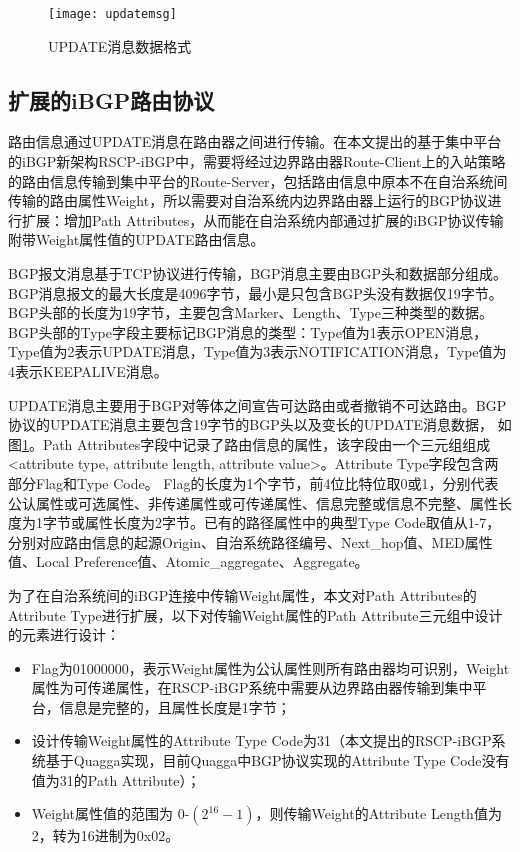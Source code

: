 \begin{figure}
  \centering
  \texttt{[image: updatemsg]}
  \caption{UPDATE消息数据格式}
  \label{fig:updatemsg}
\end{figure}



\subsection{扩展的iBGP路由协议}
路由信息通过UPDATE消息在路由器之间进行传输。在本文提出的基于集中平台的iBGP新架构RSCP-iBGP中，需要将经过边界路由器Route-Client上的入站策略的路由信息传输到集中平台的Route-Server，包括路由信息中原本不在自治系统间传输的路由属性Weight，所以需要对自治系统内边界路由器上运行的BGP协议进行扩展：增加Path Attributes，从而能在自治系统内部通过扩展的iBGP协议传输附带Weight属性值的UPDATE路由信息。

BGP报文消息\cite{rfc4271}基于TCP协议进行传输，BGP消息主要由BGP头和数据部分组成。BGP消息报文的最大长度是4096字节，最小是只包含BGP头没有数据仅19字节。BGP头部的长度为19字节，主要包含Marker、Length、Type三种类型的数据。BGP头部的Type字段主要标记BGP消息的类型：Type值为1表示OPEN消息，Type值为2表示UPDATE消息，Type值为3表示NOTIFICATION消息，Type值为4表示KEEPALIVE消息。

UPDATE消息主要用于BGP对等体之间宣告可达路由或者撤销不可达路由。BGP协议的UPDATE消息主要包含19字节的BGP头以及变长的UPDATE消息数据， 如图\ref{fig:updatemsg}。Path Attributes字段中记录了路由信息的属性，该字段由一个三元组组成<attribute type, attribute length, attribute value>。Attribute Type字段包含两部分Flag和Type Code。 Flag的长度为1个字节，前4位比特位取0或1，分别代表公认属性或可选属性、非传递属性或可传递属性、信息完整或信息不完整、属性长度为1字节或属性长度为2字节。已有的路径属性中的典型Type Code取值从1-7，分别对应路由信息的起源Origin、自治系统路径编号、Next\_hop值、MED属性值、Local Preference值、Atomic\_aggregate、Aggregate。

为了在自治系统间的iBGP连接中传输Weight属性，本文对Path Attributes的Attribute Type进行扩展，以下对传输Weight属性的Path Attribute三元组中设计的元素进行设计：
\begin{itemize}
  \item Flag为01000000，表示Weight属性为公认属性则所有路由器均可识别，Weight属性为可传递属性，在RSCP-iBGP系统中需要从边界路由器传输到集中平台，信息是完整的，且属性长度是1字节；
  \item 设计传输Weight属性的Attribute Type Code为31（本文提出的RSCP-iBGP系统基于Quagga\cite{quagga}实现，目前Quagga中BGP协议实现的Attribute Type Code没有值为31的Path Attribute）；
  \item Weight属性值的范围为 0-$(2^{16}-1)$，则传输Weight的Attribute Length值为2，转为16进制为0x02。
\end{itemize}

